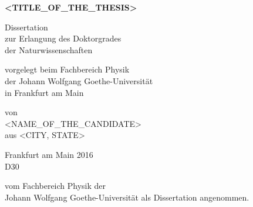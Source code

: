 \documentclass{cd-cover}
\begin{document}
    \CDbookletTopMargin=0mm
    \CDbookletMargin=5mm
    \begin{bookletsheets}
        \vspace*{3mm}

        \begin{center} \sffamily\Large\bfseries
            <TITLE_OF_THE_THESIS>
        \end{center}

        \vspace*{3mm}

        \begin{center} \sffamily\small
            Dissertation\\
            zur Erlangung des Doktorgrades\\
            der Naturwissenschaften
        \end{center}

        \vspace*{2mm}

        \begin{center} \sffamily\small
            vorgelegt beim Fachbereich Physik\\
            der Johann Wolfgang Goethe-Universit\"at\\
            in Frankfurt am Main
        \end{center}

        \vspace*{2mm}

        \begin{center} \sffamily\small
            von\\
            <NAME_OF_THE_CANDIDATE>\\
            aus <CITY, STATE>
        \end{center}

        \vspace*{2mm}

        \begin{center} \sffamily\small
        Frankfurt am Main 2016\\
        D30
        \end{center}

        \vspace*{0.25\textheight}

        \noindent{}%
        vom Fachbereich Physik der \\[2pt]
        Johann Wolfgang Goethe-Universit\"at als Dissertation angenommen.

        \vspace*{2cm}


\end{bookletsheets}
\end{document}
